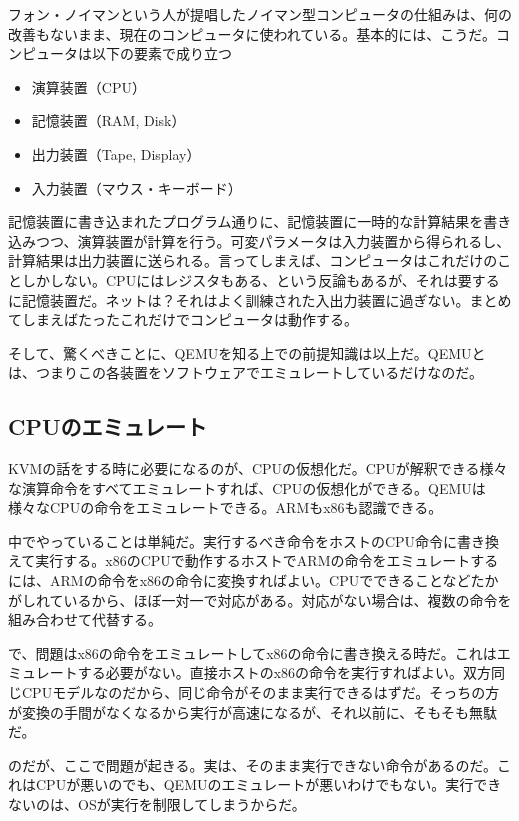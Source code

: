 ﻿\documentclass[9pt,b5paper,tombo,openany]{jsbook}
\begin{document}
フォン・ノイマンという人が提唱したノイマン型コンピュータの仕組みは、何の改善もないまま、現在のコンピュータに使われている。基本的には、こうだ。コンピュータは以下の要素で成り立つ

\begin{itemize}
  \item 演算装置（CPU）
  \item 記憶装置（RAM, Disk）
  \item 出力装置（Tape, Display）
  \item 入力装置（マウス・キーボード）
\end{itemize}

記憶装置に書き込まれたプログラム通りに、記憶装置に一時的な計算結果を書き込みつつ、演算装置が計算を行う。可変パラメータは入力装置から得られるし、計算結果は出力装置に送られる。言ってしまえば、コンピュータはこれだけのことしかしない。CPUにはレジスタもある、という反論もあるが、それは要するに記憶装置だ。ネットは？それはよく訓練された入出力装置に過ぎない。まとめてしまえばたったこれだけでコンピュータは動作する。

そして、驚くべきことに、QEMUを知る上での前提知識は以上だ。QEMUとは、つまりこの各装置をソフトウェアでエミュレートしているだけなのだ。

\subsection{CPUのエミュレート}

KVMの話をする時に必要になるのが、CPUの仮想化だ。CPUが解釈できる様々な演算命令をすべてエミュレートすれば、CPUの仮想化ができる。QEMUは様々なCPUの命令をエミュレートできる。ARMもx86も認識できる。

中でやっていることは単純だ。実行するべき命令をホストのCPU命令に書き換えて実行する。x86のCPUで動作するホストでARMの命令をエミュレートするには、ARMの命令をx86の命令に変換すればよい。CPUでできることなどたかがしれているから、ほぼ一対一で対応がある。対応がない場合は、複数の命令を組み合わせて代替する。

で、問題はx86の命令をエミュレートしてx86の命令に書き換える時だ。これはエミュレートする必要がない。直接ホストのx86の命令を実行すればよい。双方同じCPUモデルなのだから、同じ命令がそのまま実行できるはずだ。そっちの方が変換の手間がなくなるから実行が高速になるが、それ以前に、そもそも無駄だ。

のだが、ここで問題が起きる。実は、そのまま実行できない命令があるのだ。これはCPUが悪いのでも、QEMUのエミュレートが悪いわけでもない。実行できないのは、OSが実行を制限してしまうからだ。
\end{document}
